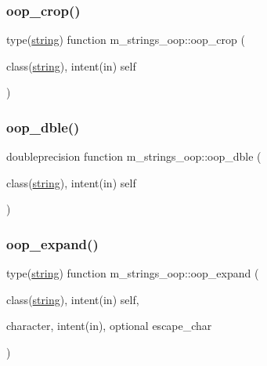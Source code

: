 \subsubsection{\texorpdfstring{oop\+\_\+crop()}{oop\_crop()}}
{\footnotesize\ttfamily type(\mbox{\hyperlink{structm__strings__oop_1_1string}{string}}) function m\+\_\+strings\+\_\+oop\+::oop\+\_\+crop (\begin{DoxyParamCaption}\item[{class(\mbox{\hyperlink{structm__strings__oop_1_1string}{string}}), intent(in)}]{self }\end{DoxyParamCaption})\hspace{0.3cm}{\ttfamily [private]}}

\mbox{\label{namespacem__strings__oop_aa6eaf2b8a12a905d0ebaa21a84871dec}} 
\subsubsection{\texorpdfstring{oop\+\_\+dble()}{oop\_dble()}}
{\footnotesize\ttfamily doubleprecision function m\+\_\+strings\+\_\+oop\+::oop\+\_\+dble (\begin{DoxyParamCaption}\item[{class(\mbox{\hyperlink{structm__strings__oop_1_1string}{string}}), intent(in)}]{self }\end{DoxyParamCaption})\hspace{0.3cm}{\ttfamily [private]}}

\mbox{\label{namespacem__strings__oop_a5b96d2a6f242a096cd5788cf0802e825}} 
\subsubsection{\texorpdfstring{oop\+\_\+expand()}{oop\_expand()}}
{\footnotesize\ttfamily type(\mbox{\hyperlink{structm__strings__oop_1_1string}{string}}) function m\+\_\+strings\+\_\+oop\+::oop\+\_\+expand (\begin{DoxyParamCaption}\item[{class(\mbox{\hyperlink{structm__strings__oop_1_1string}{string}}), intent(in)}]{self,  }\item[{character, intent(in), optional}]{escape\+\_\+char }\end{DoxyParamCaption})\hspace{0.3cm}{\ttfamily [private]}}

